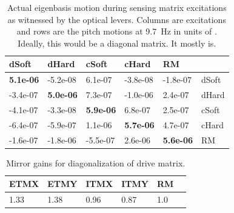 


\begin{table}
\centering
\caption[Actual eigenbasis motion during sensing matrix excitations]{Actual eigenbasis motion during sensing matrix excitations as
  witnessed by the optical levers. Columns are excitations and rows are
  the pitch motions at 9.7~Hz in units of \microrad. Ideally, this
  would be a diagonal matrix. It mostly is.}
\begin{tabular}{l l l l l l}
\hline
dSoft & dHard  & cSoft & cHard & RM & \\
\hline
   \textbf{5.1e-06} & -5.2e-08  & 6.1e-07 & -3.8e-08 &  -1.8e-07 & dSoft\\
  -3.4e-07 &  \textbf{5.0e-06}  &  7.3e-07 & -1.0e-06 &  2.4e-07 & dHard\\
  -4.1e-07 & -3.3e-08 &  \textbf{5.9e-06} &  6.8e-07 &  2.5e-07 & cSoft\\
  -6.4e-07 & -5.9e-07 &  1.1e-06 &  \textbf{5.7e-06} &  4.7e-07 & cHard\\
  -1.6e-07 & -1.8e-06 & -5.5e-07 &   2.6e-06 &  \textbf{5.6e-06} & RM\\
\hline
\end{tabular}
\label{table:excitations_calibrated}
\end{table}



\begin{table}
\centering
\caption[Mirror gains for diagonalization of drive matrix]{Mirror
  gains for diagonalization of drive matrix.} 
\begin{tabular}{l l l l l l}
\hline
ETMX & ETMY & ITMX & ITMY & RM & \\
\hline
1.33 & 1.38 & 0.96 & 0.87 & 1.0 \\
\hline
\end{tabular}
\label{table:mirrorgains}
\end{table}




